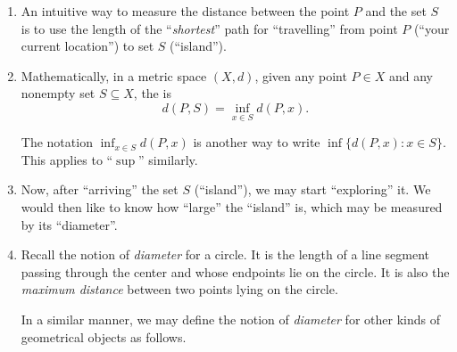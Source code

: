\begin{enumerate}
\item An intuitive way to measure the distance between the point \(P\) and the
set \(S\) is to use the length of the ``\emph{shortest}'' path for ``travelling''
from point \(P\) (``your current location'') to set \(S\) (``island'').
\begin{center}
\end{center}
\item Mathematically, in a metric space \((X,d)\), given any point \(P\in X\)
and any nonempty set \(S\subseteq X\), the  is
\[
d(P,S)=\inf_{x\in S}d(P,x).
\]
\begin{note}
The notation \(\inf_{x\in S}d(P,x)\) is another way to write
\(\inf\{d(P,x):x\in S\}\). This applies to ``\(\sup\)'' similarly.
\end{note}
\item Now, after ``arriving'' the set \(S\) (``island''), we may start
``exploring''  it. We would then like to know how ``large'' the
``island'' is, which may be measured by its ``diameter''.
\begin{center}
\end{center}
\item Recall the notion of \emph{diameter} for a circle. It is the length of a
line segment passing through the center and whose endpoints lie on the circle.
It is also the \emph{maximum distance} between two points lying on the circle.
\begin{center}
\end{center}
In a similar manner, we may define the notion of \emph{diameter} for other
kinds of geometrical objects as follows.


\end{enumerate}

